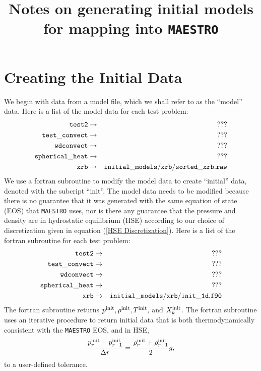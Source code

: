 \documentclass[11pt]{article}
\title{Notes on generating initial models for mapping into {\tt MAESTRO}}
\def\init  {\rm init}
\begin{document}
\maketitle
\tableofcontents

\clearpage

\section{Creating the Initial Data}
We begin with data from a model file, which we shall refer to as the ``model'' data.  Here is a list of the model data for each test problem:
\begin{eqnarray}
{\tt test2} & \rightarrow & {\tt ???} \nonumber \\
{\tt test\_convect} & \rightarrow & {\tt ???} \nonumber \\
{\tt wdconvect} & \rightarrow & {\tt ???} \nonumber \\
{\tt spherical\_heat} & \rightarrow & {\tt ???} \nonumber \\
{\tt xrb} & \rightarrow & {\tt initial\_models/xrb/sorted\_xrb.raw} \nonumber
\end{eqnarray}
We use a fortran subroutine to modify the model data to create ``initial'' data, denoted with the subcript ``init''.  The model data needs to be modified because there is no guarantee that it was generated with the same equation of state (EOS) that {\tt MAESTRO} uses, nor is there any guarantee that the pressure and density are in hydrostatic equilibrium (HSE) according to our choice of discretization given in equation (\ref{HSE Discretization}).  Here is a list of the fortran subroutine for each test problem:
\begin{eqnarray}
{\tt test2} & \rightarrow & {\tt ???} \nonumber \\
{\tt test\_convect} & \rightarrow & {\tt ???} \nonumber \\
{\tt wdconvect} & \rightarrow & {\tt ???} \nonumber \\
{\tt spherical\_heat} & \rightarrow & {\tt ???} \nonumber \\
{\tt xrb} & \rightarrow & {\tt initial\_models/xrb/init\_1d.f90} \nonumber
\end{eqnarray}
The fortran subroutine returns $p^{\init}, \rho^{\init}, T^{\init},$ and $X_k^{\init}$.  The fortran subroutine uses an iterative procedure to return initial data that is both thermodynamically consistent with the {\tt MAESTRO} EOS, and in HSE,
\begin{equation}
\frac{p_r^{\init} - p_{r-1}^{\init}}{\Delta r} = \frac{\rho_r^{\init} + \rho_{r-1}^{\init}}{2}g,\label{HSE Discretization}
\end{equation}
to a user-defined tolerance.
\end{document}
